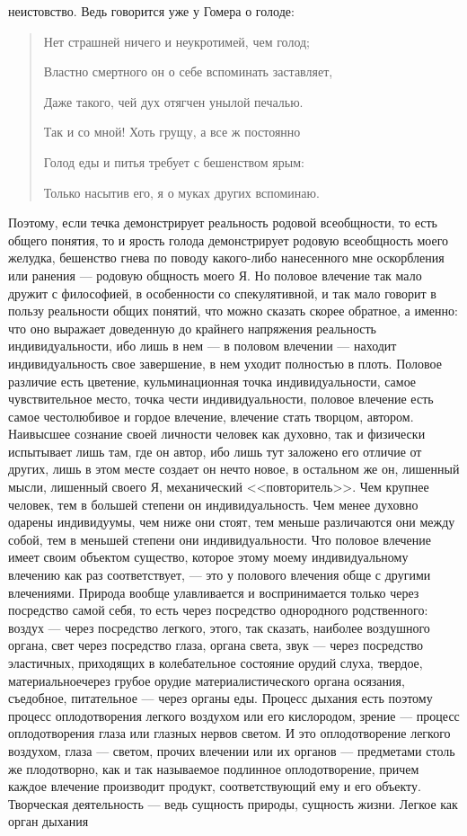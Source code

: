 \documentclass[12pt]{article}
\begin{document}
неистовство. Ведь говорится уже у Гомера о голоде: 

\begin{quote}
    
Нет страшней ничего и неукротимей, чем голод; 

Властно смертного он о себе вспоминать заставляет, 

Даже такого, чей дух отягчен унылой печалью. 

Так и со мной! Хоть грущу, а все ж постоянно 

Голод еды и питья требует с бешенством ярым: 

Только насытив его, я о муках других вспоминаю. 

\end{quote}

Поэтому, если течка демонстрирует реальность родовой всеобщности, то есть общего понятия, то и ярость голода демонстрирует родовую всеобщность моего желудка, бешенство гнева по поводу какого-либо нанесенного мне оскорбления или ранения --- родовую общность моего Я. Но половое влечение так мало дружит с философией, в особенности со спекулятивной, и так мало говорит в пользу реальности общих понятий, что можно сказать скорее обратное, а именно: что оно выражает доведенную до крайнего напряжения реальность индивидуальности, ибо лишь в нем --- в половом влечении --- находит индивидуальность свое завершение, в нем уходит полностью в плоть. Половое различие есть цветение, кульминационная точка индивидуальности, самое чувствительное место, точка чести индивидуальности, половое влечение есть самое честолюбивое и гордое влечение, влечение стать творцом, автором. Наивысшее сознание своей личности человек как духовно, так и физически испытывает лишь там, где он автор, ибо лишь тут заложено его отличие от других, лишь в этом месте создает он нечто новое, в остальном же он, лишенный мысли, лишенный своего Я, механический <<повторитель>>. Чем крупнее человек, тем в большей степени он индивидуальность. Чем менее духовно одарены индивидуумы, чем ниже они стоят, тем меньше различаются они между собой, тем в меньшей степени они индивидуальности. Что половое влечение имеет своим объектом существо, которое этому моему индивидуальному влечению как раз соответствует, --- это у полового влечения обще с другими влечениями. Природа вообще улавливается и воспринимается только через посредство самой себя, то есть через посредство однородного родственного: воздух --- через посредство легкого, этого, так сказать, наиболее воздушного органа, свет через посредство глаза, органа света, звук --- через посредство эластичных, приходящих в колебательное состояние орудий слуха, твердое, материальноечерез грубое орудие материалистического органа осязания, съедобное, питательное --- через органы еды. Процесс дыхания есть поэтому процесс оплодотворения легкого воздухом или его кислородом, зрение --- процесс оплодотворения глаза или глазных нервов светом. И это оплодотворение легкого воздухом, глаза --- светом, прочих влечении или их органов --- предметами столь же плодотворно, как и так называемое подлинное оплодотворение, причем каждое влечение производит продукт, соответствующий ему и его объекту. Творческая деятельность --- ведь сущность природы, сущность жизни. Легкое как орган дыхания 
\end{document}
